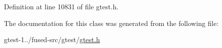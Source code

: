 \-Definition at line 10831 of file gtest.\-h.



\-The documentation for this class was generated from the following file\-:\begin{DoxyCompactItemize}
\item 
gtest-\/1../fused-\/src/gtest/\hyperlink{fused-src_2gtest_2gtest_8h}{gtest.\-h}\end{DoxyCompactItemize}
